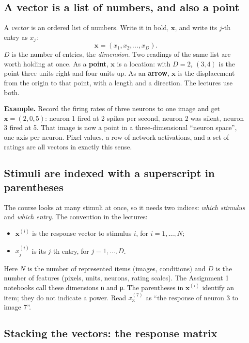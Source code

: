 \documentclass[11pt]{article}
\newcommand{\vx}{\bm{x}}
\begin{document}
\subsection{A vector is a list of numbers, and also a point}

A \emph{vector} is an ordered list of numbers. Write it in bold, $\vx$, and write its
$j$-th entry as $x_j$:
\[
\vx = (x_1, x_2, \dots, x_D) .
\]
$D$ is the number of entries, the \emph{dimension}. Two readings of the same list are
worth holding at once. As a \textbf{point}, $\vx$ is a location: with $D=2$, $(3, 4)$ is
the point three units right and four units up. As an \textbf{arrow}, $\vx$ is the
displacement from the origin to that point, with a length and a direction. The lectures use both.

\textbf{Example.} Record the firing rates of three neurons to one image and get
$\vx = (2, 0, 5)$: neuron 1 fired at 2 spikes per second, neuron 2 was silent, neuron 3
fired at 5. That image is now a point in a three-dimensional ``neuron space'', one axis per
neuron. Pixel values, a row of network activations, and a set of ratings are all vectors
in exactly this sense.

\subsection{Stimuli are indexed with a superscript in parentheses}

The course looks at many stimuli at once, so it needs two indices: \emph{which stimulus}
and \emph{which entry}. The convention in the lectures:
\begin{itemize}
\item $\vx^{(i)}$ is the response vector to stimulus $i$, for $i = 1, \dots, N$;
\item $x^{(i)}_j$ is its $j$-th entry, for $j = 1, \dots, D$.
\end{itemize}
Here $N$ is the number of represented items (images, conditions) and $D$ is the number of
features (pixels, units, neurons, rating scales). The Assignment 1 notebooks call these
dimensions \texttt{n} and \texttt{p}. The parentheses in $\vx^{(i)}$ identify an item; they
do not indicate a power. Read $x^{(7)}_{3}$ as ``the response of neuron 3 to image 7''.

\subsection{Stacking the vectors: the response matrix}
\end{document}
